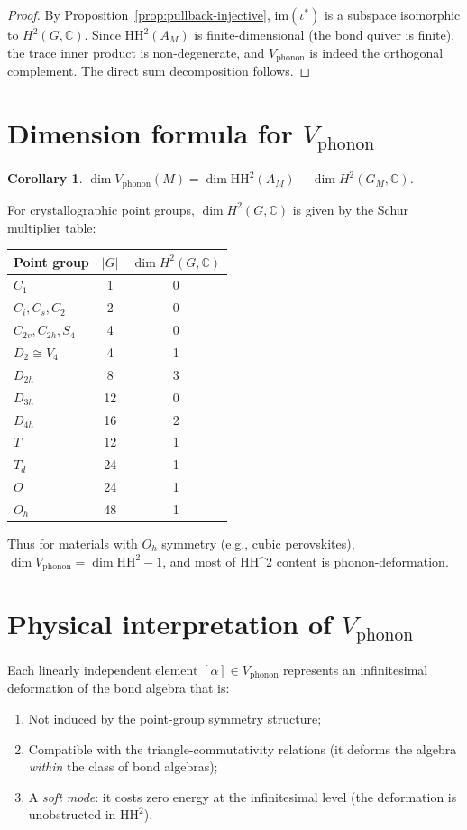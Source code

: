 \documentclass[12pt,a4paper]{article}
\newtheorem{corollary}[theorem]{Corollary}
\newcommand{\HH}{\mathrm{HH}}
\newcommand{\CC}{\mathbb{C}}
\newcommand{\im}{\mathrm{im}}
\begin{document}
\begin{proof}
By Proposition~\ref{prop:pullback-injective}, $\im(\iota^*)$ is a
subspace isomorphic to $H^2(G, \CC)$. Since $\HH^2(A_M)$ is
finite-dimensional (the bond quiver is finite), the trace inner
product is non-degenerate, and $V_{\mathrm{phonon}}$ is indeed the
orthogonal complement. The direct sum decomposition follows.
\end{proof}

\section{Dimension formula for $V_{\mathrm{phonon}}$}

\begin{corollary}
$\dim V_{\mathrm{phonon}}(M) = \dim \HH^2(A_M) - \dim H^2(G_M, \CC)$.
\end{corollary}

For crystallographic point groups, $\dim H^2(G, \CC)$ is given by the
Schur multiplier table:
\begin{center}
\begin{tabular}{lcc}
\hline
Point group & $|G|$ & $\dim H^2(G, \CC)$ \\
\hline
$C_1$ & 1 & 0 \\
$C_i, C_s, C_2$ & 2 & 0 \\
$C_{2v}, C_{2h}, S_4$ & 4 & 0 \\
$D_2 \cong V_4$ & 4 & 1 \\
$D_{2h}$ & 8 & 3 \\
$D_{3h}$ & 12 & 0 \\
$D_{4h}$ & 16 & 2 \\
$T$ & 12 & 1 \\
$T_d$ & 24 & 1 \\
$O$ & 24 & 1 \\
$O_h$ & 48 & 1 \\
\hline
\end{tabular}
\end{center}

Thus for materials with $O_h$ symmetry (e.g., cubic perovskites),
$\dim V_{\mathrm{phonon}} = \dim \HH^2 - 1$, and most of HH^2
content is phonon-deformation.

\section{Physical interpretation of $V_{\mathrm{phonon}}$}

Each linearly independent element $[\alpha] \in V_{\mathrm{phonon}}$
represents an infinitesimal deformation of the bond algebra that is:
\begin{enumerate}
\item Not induced by the point-group symmetry structure;
\item Compatible with the triangle-commutativity relations (it
  deforms the algebra \emph{within} the class of bond algebras);
\item A \emph{soft mode}: it costs zero energy at the infinitesimal
  level (the deformation is unobstructed in $\HH^2$).
\end{enumerate}
\end{document}
